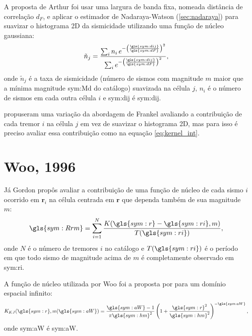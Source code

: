 A proposta de Arthur \citet{frankel_1995} foi usar uma largura de banda fixa, 
nomeada distância de correlação $d_F$, e aplicar o estimador de Nadaraya-Watson (\ref{sec:nadaraya})
para suavizar o histograma 2D da sismicidade utilizando uma função de núcleo gaussiana:
\begin{equation}
	\ensuremath{
		\tilde{n}_j = \frac{ \sum_{i} n_i \,e^{ - \left(\frac{\gls{sym:dij}}{\gls{sym:dF}}\right)^2}}
						   { \sum_{i}     e^{ - \left(\frac{\gls{sym:dij}}{\gls{sym:dF}}\right)^2}},
	}
	\label{eq:ni}
\end{equation}
onde $\tilde{n}_j$ é a taxa de sismicidade (número de sismos com magnitude $m$ maior que a mínima magnitude
\gls{sym:Md} do catálogo) suavizada
na célula $j$, $n_i$ é o número de sismos em cada outra célula $i$ e
	\gls{sym:dij} é \glsdesc{sym:dij}.


\citet{zechar_2010-2} propuseram uma variação da abordagem de Frankel avaliando a contribuição
de cada tremor $i$ na célula $j$ em vez de suavizar o histograma 2D, mas para isso
é preciso avaliar essa contribuição como na equação \eqref{eq:kernel_int}.


\section{Woo, 1996}
\label{sec:woo}

Já Gordon \citet{woo_1996} propôs avaliar a contribuição de uma função de núcleo 
de cada sismo $i$ ocorrido em $\boldsymbol{r}_i$ 
na célula centrada em $\boldsymbol{r}$ que dependa também de sua
magnitude $m$:
\begin{equation}
	\ensuremath{
		\gls{sym:Rrm} = \sum_{i=1}^{N} \frac{ K(\gls{sym:r} - \gls{sym:ri}, m)}
											{T({\gls{sym:ri})}},
	}
	\label{eq:Rrm}
\end{equation}
onde $N$ é o número de tremores $i$ no catálogo 
e $T(\gls{sym:ri})$ é o período em que todo sismo de magnitude acima de $m$ é completamente observado 
em \gls{sym:ri}.

A função de núcleo utilizada por Woo foi a proposta por \citet{kagan_knopoff_1980}
para um domínio espacial infinito:
\begin{equation}
	\ensuremath{
		K_{KJ}(\gls{sym:r}, m \arrowvert \gls{sym:aW}) =  \frac{  \gls{sym:aW}  -1}{\pi\gls{sym:hm}^2}
							\left( 1 + \frac{\gls{sym:r}^2}{\gls{sym:hm}^2} \right)^{-\gls{sym:aW}},
	}
	\label{eq:k_kj}
\end{equation}
onde \gls{sym:aW} é \glsdesc{sym:aW}.

